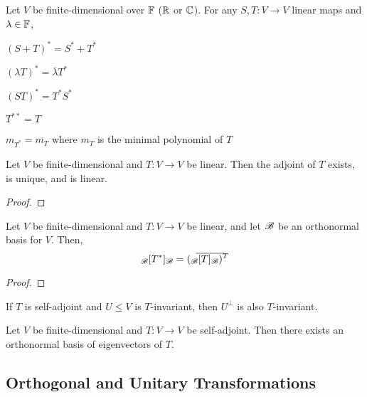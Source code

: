 \documentclass{styles/tufte}
\begin{document}
  \begin{proposition}{}{}
    Let $V$ be finite-dimensional over $\mathbb{F}$ ($\mathbb{R}$ or $\mathbb{C}$). For any $S, T: V \to V$ linear maps and $\lambda \in \mathbb{F}$,
    \begin{romanenum}
      \item $(S + T)^* = S^* + T^*$
      \item $(\lambda T)^* = \overline{\lambda} T^*$
      \item $(ST)^* = T^* S^*$
      \item $T^{**} = T$
      \item $m_{T^*} = \overline{m_T}$ where $m_T$ is the minimal polynomial of $T$
    \end{romanenum}
  \end{proposition}
  
  \begin{theorem}{}{}
    Let $V$ be finite-dimensional and $T: V \to V$ be linear. Then the adjoint of $T$ exists, is unique, and is linear.
  \end{theorem}
  \begin{proof}
    
  \end{proof}
  
  \begin{proposition}{}{}
    Let $V$ be finite-dimensional and $T: V \to V$ be linear, and let $\mathscr{B}$ be an orthonormal basis for $V$. Then,
    \[ \changeofbasis{\BB}{T^*}{\BB} = (\overline{\changeofbasis{\BB}{T}{\BB}})^T \]
  \end{proposition}
  \begin{proof}
    
  \end{proof}
  
  \begin{proposition}{}{}
    If $T$ is self-adjoint and $U \leqslant V$ is $T$-invariant, then $U^\bot$ is also $T$-invariant.
  \end{proposition}
  
  \begin{theorem}{}{}
    Let $V$ be finite-dimensional and $T: V \to V$ be self-adjoint. Then there exists an orthonormal basis of eigenvectors of $T$.
  \end{theorem}


\subsection{Orthogonal and Unitary Transformations}
  
\end{document}
